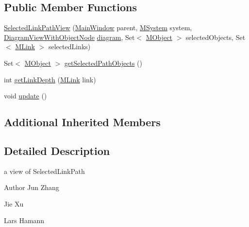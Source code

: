 \subsection*{Public Member Functions}
\begin{DoxyCompactItemize}
\item 
\hyperlink{classorg_1_1tzi_1_1use_1_1gui_1_1views_1_1selection_1_1objectselection_1_1_selected_link_path_view_a94aedd4cf75553573e8a548406268c96}{Selected\-Link\-Path\-View} (\hyperlink{classorg_1_1tzi_1_1use_1_1gui_1_1main_1_1_main_window}{Main\-Window} parent, \hyperlink{classorg_1_1tzi_1_1use_1_1uml_1_1sys_1_1_m_system}{M\-System} system, \hyperlink{classorg_1_1tzi_1_1use_1_1gui_1_1views_1_1diagrams_1_1_diagram_view_with_object_node}{Diagram\-View\-With\-Object\-Node} \hyperlink{classorg_1_1tzi_1_1use_1_1gui_1_1views_1_1selection_1_1_object_selection_view_a3aab89dd6fcf330a0095e90ac047f196}{diagram}, Set$<$ \hyperlink{interfaceorg_1_1tzi_1_1use_1_1uml_1_1sys_1_1_m_object}{M\-Object} $>$ selected\-Objects, Set$<$ \hyperlink{interfaceorg_1_1tzi_1_1use_1_1uml_1_1sys_1_1_m_link}{M\-Link} $>$ selected\-Links)
\item 
Set$<$ \hyperlink{interfaceorg_1_1tzi_1_1use_1_1uml_1_1sys_1_1_m_object}{M\-Object} $>$ \hyperlink{classorg_1_1tzi_1_1use_1_1gui_1_1views_1_1selection_1_1objectselection_1_1_selected_link_path_view_a541a4d27673f67695249e69735dde279}{get\-Selected\-Path\-Objects} ()
\item 
int \hyperlink{classorg_1_1tzi_1_1use_1_1gui_1_1views_1_1selection_1_1objectselection_1_1_selected_link_path_view_afdc6b0f83d57a2f026ac6babfecef744}{get\-Link\-Depth} (\hyperlink{interfaceorg_1_1tzi_1_1use_1_1uml_1_1sys_1_1_m_link}{M\-Link} link)
\item 
void \hyperlink{classorg_1_1tzi_1_1use_1_1gui_1_1views_1_1selection_1_1objectselection_1_1_selected_link_path_view_a78e8d51dd834a12e9433a6bb267c3ee7}{update} ()
\end{DoxyCompactItemize}
\subsection*{Additional Inherited Members}


\subsection{Detailed Description}
a view of Selected\-Link\-Path \begin{DoxyAuthor}{Author}
Jun Zhang 

Jie Xu 

Lars Hamann 
\end{DoxyAuthor}


